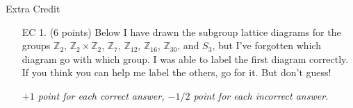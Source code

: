 \documentclass[fleqn,12pt]{article}
\newcommand{\<}{\ensuremath{\langle}}
\renewcommand{\>}{\ensuremath{\rangle}}
\newcommand{\Z}{\ensuremath{\mathbb{Z}}}
\begin{document}
\begin{center}
  Extra Credit
\end{center}
\begin{enumerate}
\item[EC 1.] ($6$ points)
Below I have drawn the subgroup lattice diagrams for the groups $\Z_2$, $\Z_2 \times \Z_2$,
$\Z_7$, $\Z_{12}$, $\Z_{16}$, $\Z_{30}$, and $S_3$, but I've forgotten which diagram
go with which group.  I was able to label the first diagram
correctly.  If you think you can help me label the others, go for it. But
don't guess! 

\medskip

{\it $+1$ point for each correct answer, $-1/2$ point for each incorrect answer.} 

\bigskip


\end{enumerate}
\end{document}
